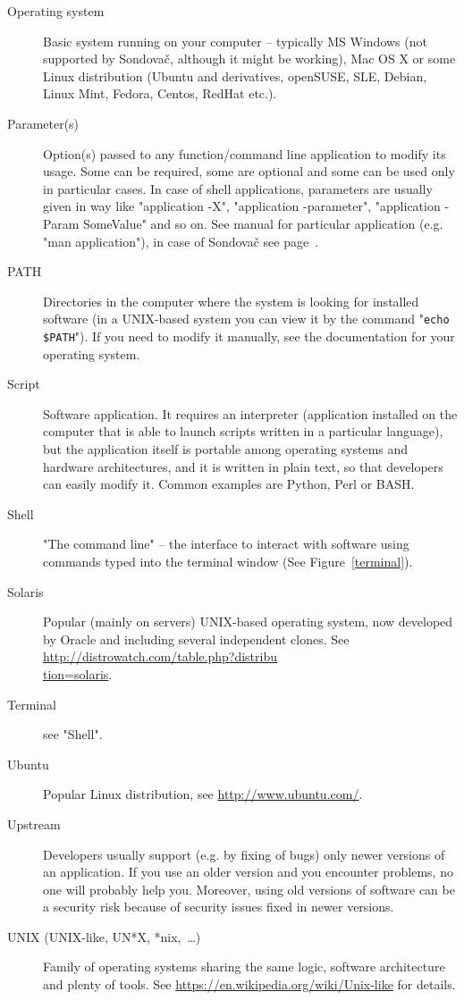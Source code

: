 \documentclass[a4paper, 11pt, twoside]{article}
\begin{document}
\begin{description}
\item[Operating system] Basic system running on your computer -- typically MS Windows (not supported by Sondovač, although it might be working), Mac OS X or some Linux distribution (Ubuntu and derivatives, openSUSE, SLE, Debian, Linux Mint, Fedora, Centos, RedHat etc.).
\item[Parameter(s)] Option(s) passed to any function/command line application to modify its usage. Some can be required, some are optional and some can be used only in particular cases. In case of shell applications, parameters are usually given in way like "application -X", "application -parameter", "application -Param SomeValue" and so on. See manual for particular application (e.g. "man application"), in case of Sondovač see page~\pageref{script-usage}.
\item[PATH] Directories in the computer where the system is looking for installed software (in a UNIX-based system you can view it by the command "\texttt{echo \$PATH}"). If you need to modify it manually, see the documentation for your operating system.
\item[Script] Software application. It requires an interpreter (application installed on the computer that is able to launch scripts written in a particular language), but the application itself is portable among operating systems and hardware architectures, and it is written in plain text, so that developers can easily modify it. Common examples are Python, Perl or BASH.
\item[Shell] "The command line" -- the interface to interact with software using commands typed into the terminal window (See Figure~\ref{terminal}).
\item[Solaris] Popular (mainly on servers) UNIX-based operating system, now developed by Oracle and including several independent clones. See \href{http://distrowatch.com/table.php?distribution=solaris}{http://distrowatch.com/table.php?distribu\\tion=solaris}.
\item[Terminal] see "Shell".
\item[Ubuntu] Popular Linux distribution, see \href{http://www.ubuntu.com/}{http://www.ubuntu.com/}.
\item[Upstream] Developers usually support (e.g. by fixing of bugs) only newer versions of an application. If you use an older version and you encounter problems, no one will probably help you. Moreover, using old versions of software can be a security risk because of security issues fixed in newer versions.
\item[UNIX (UNIX-like, UN*X, *nix,~\ldots)] Family of operating systems sharing the same logic, software architecture and plenty of tools. See \href{https://en.wikipedia.org/wiki/Unix-like}{https://en.wikipedia.org/wiki/Unix-like} for details.
\end{description}
\end{document}
